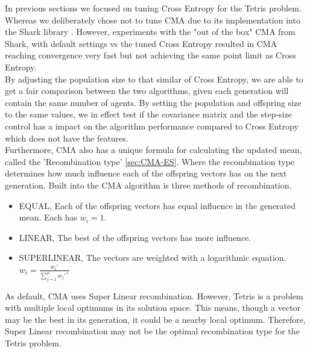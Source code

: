 In previous sections we focused on tuning Cross Entropy for the Tetris 
problem. Whereas we deliberately chose not to tune CMA due to its implementation 
into the Shark library \citep{shark08}. However, experiments with the "out of 
the box" CMA from Shark, with default settings vs the tuned Cross Entropy
resulted in CMA reaching convergence very fast but not achieving the same point
limit as Cross Entropy.\\
By adjusting the population size to that similar of Cross Entropy, we are able
to get a fair comparison between the two algorithms, given each generation will
contain the same number of agents. By setting the population and offspring size
to the same values, we in effect test if the covariance matrix and the step-size
control has a impact on the algorithm performance compared to Cross Entropy
which does not have the features.\\
Furthermore, CMA also has a unique formula for calculating the updated mean,
called the 'Recombination type' \ref{sec:CMA-ES}. Where the recombination type
determines how much influence each of the offspring vectors has on the next
generation. Built into the CMA algorithm is three methods of recombination. 
\begin{itemize}
\item EQUAL, Each of the offspring vectors has equal influence in the generated mean. Each has $w_i = 1$.
\item LINEAR, The best of the offspring vectors has more influence. 
\item SUPERLINEAR, The vectors are weighted with a logarithmic equation. $w_i = \frac{w_i'}{\sum_{j=1}^{\mu} w_j'^+}$
\end{itemize}
As default, CMA uses Super Linear recombination. However, Tetris is a problem
with multiple local optimums in its solution space. This means, though a vector may be the best in its generation, it could be a nearby local optimum. Therefore, Super Linear recombination may not be the optimal recombination type for the Tetris problem.\\
\\
\\
\\
\\
\\

